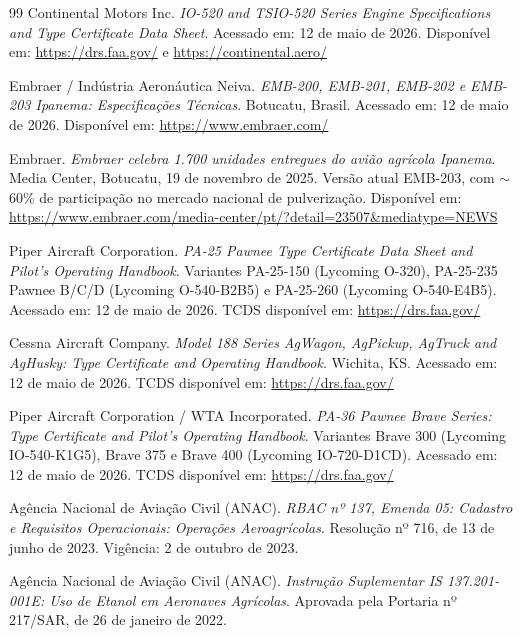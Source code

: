 \documentclass[a4paper,12pt]{article}
\begin{document}
\begin{thebibliography}{99}
    Continental Motors Inc. \textit{IO-520 and TSIO-520 Series Engine Specifications and Type Certificate Data Sheet}. Acessado em: 12 de maio de 2026. Disponível em: \url{https://drs.faa.gov/} e \url{https://continental.aero/}


    Embraer / Indústria Aeronáutica Neiva. \textit{EMB-200, EMB-201, EMB-202 e EMB-203 Ipanema: Especificações Técnicas}. Botucatu, Brasil. Acessado em: 12 de maio de 2026. Disponível em: \url{https://www.embraer.com/}

    Embraer. \textit{Embraer celebra 1.700 unidades entregues do avião agrícola Ipanema}. Media Center, Botucatu, 19 de novembro de 2025. Versão atual EMB-203, com $\sim$60\% de participação no mercado nacional de pulverização. Disponível em: \url{https://www.embraer.com/media-center/pt/?detail=23507&mediatype=NEWS}

    Piper Aircraft Corporation. \textit{PA-25 Pawnee Type Certificate Data Sheet and Pilot's Operating Handbook}. Variantes PA-25-150 (Lycoming O-320), PA-25-235 Pawnee B/C/D (Lycoming O-540-B2B5) e PA-25-260 (Lycoming O-540-E4B5). Acessado em: 12 de maio de 2026. TCDS disponível em: \url{https://drs.faa.gov/}

    Cessna Aircraft Company. \textit{Model 188 Series AgWagon, AgPickup, AgTruck and AgHusky: Type Certificate and Operating Handbook}. Wichita, KS. Acessado em: 12 de maio de 2026. TCDS disponível em: \url{https://drs.faa.gov/}

    Piper Aircraft Corporation / WTA Incorporated. \textit{PA-36 Pawnee Brave Series: Type Certificate and Pilot's Operating Handbook}. Variantes Brave 300 (Lycoming IO-540-K1G5), Brave 375 e Brave 400 (Lycoming IO-720-D1CD). Acessado em: 12 de maio de 2026. TCDS disponível em: \url{https://drs.faa.gov/}


    Agência Nacional de Aviação Civil (ANAC). \textit{RBAC nº 137, Emenda 05: Cadastro e Requisitos Operacionais: Operações Aeroagrícolas}. Resolução nº 716, de 13 de junho de 2023. Vigência: 2 de outubro de 2023.

    Agência Nacional de Aviação Civil (ANAC). \textit{Instrução Suplementar IS 137.201-001E: Uso de Etanol em Aeronaves Agrícolas}. Aprovada pela Portaria nº 217/SAR, de 26 de janeiro de 2022.


\end{thebibliography}
\end{document}
